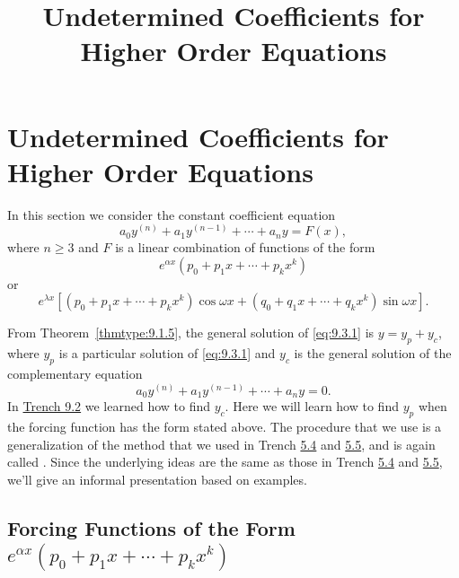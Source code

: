 \documentclass{ximera}
\title{Undetermined Coefficients for Higher Order Equations}%
\begin{document}
\begin{abstract}

\end{abstract}

\maketitle

\section*{Undetermined Coefficients for Higher Order Equations}

In this section we consider the constant coefficient equation
\begin{equation}
 \label{eq:9.3.1} a_0y^{(n)}+a_1y^{(n-1)}+\cdots+a_ny=F(x),
\end{equation}
where $n\geq 3$ and $F$ is a linear combination of
functions of the form
$$
e^{\alpha x}\left(p_0+p_1x+\cdots+p_kx^k\right)
$$
or
$$
e^{\lambda x}\left[\left(p_0+p_1x+\cdots+p_kx^k\right)
\cos\omega x+
\left(q_0+q_1x+\cdots+q_kx^k\right)
\sin\omega x\right].
$$

From Theorem~\ref{thmtype:9.1.5}, the general solution of \eqref{eq:9.3.1} is
$y=y_p+y_c$, where $y_p$ is a particular solution of \eqref{eq:9.3.1} and
$y_c$ is the general solution of the complementary equation
$$
a_0y^{(n)}+a_1y^{(n-1)}+\cdots+a_ny=0.
$$
In \href{https://ximera.osu.edu/ode/main/higherOrderConstCoeff/higherOrderConstCoeff}{Trench 9.2} we learned how to find $y_c$. Here
we
will learn how to find $y_p$ when the forcing function has the form stated
above. The procedure that we  use is a generalization of the
method that we used in Trench \href{https://ximera.osu.edu/ode/main/undeterminedCoeff/undeterminedCoeff}{5.4} and
\href{https://ximera.osu.edu/ode/main/undeterminedCoeff2/undeterminedCoeff2}{5.5}, and is again called
. Since
the underlying ideas are the same as those in
Trench \href{https://ximera.osu.edu/ode/main/undeterminedCoeff/undeterminedCoeff}{5.4} and
\href{https://ximera.osu.edu/ode/main/undeterminedCoeff2/undeterminedCoeff2}{5.5},
we'll give  an informal presentation based on
examples.

\subsection*{Forcing Functions of the Form
$e^{\alpha x}\left(p_0+p_1x+\cdots+p_kx^k\right)$}
\end{document}
